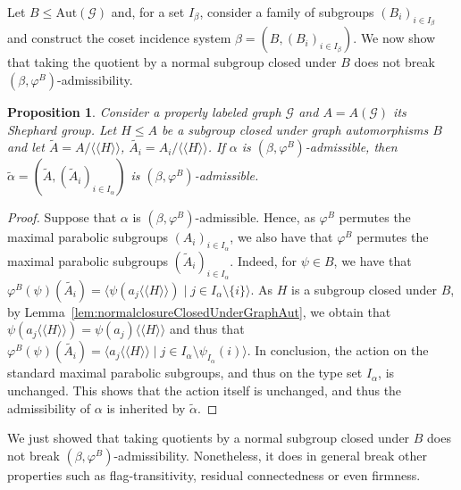 \documentclass[11pt,letterpaper]{amsart}
\newtheorem{prop}{Proposition}[section]
\newcommand{\GG}{\mathcal{G}}
\newcommand{\Aut}{\mathrm{Aut}}
\begin{document}
Let $B\leq \Aut(\GG)$ and, for a set $I_\beta$, consider a family of subgroups $(B_i)_{i\in I_\beta}$ and construct the coset incidence system $\beta=(B,(B_i)_{i\in I_\beta})$. We now show that taking the quotient by a normal subgroup closed under $B$ does not break $(\beta,\varphi^B)$-admissibility.

\begin{prop}\label{prop:QuotientAdmissible}
    Consider a properly labeled graph $\GG$ and $A=A(\GG)$ its Shephard group.
    Let $H\leq A$ be a subgroup closed under graph automorphisms $B$ and let $\tilde{A}=A/\langle\langle H\rangle\rangle$, $\tilde{A_i} = A_i/\langle\langle H\rangle\rangle$.
    If $\alpha$ is $(\beta,\varphi^B)$-admissible, then $\tilde{\alpha}=(\tilde{A},(\tilde{A}_i)_{i\in I_\alpha})$ is $(\beta,\varphi^B)$-admissible.
\end{prop}
\begin{proof}
    Suppose that $\alpha$ is $(\beta,\varphi^B)$-admissible. Hence, 
    as $\varphi^B$ permutes the maximal parabolic subgroups $(A_i)_{i\in I_\alpha}$, we also have that $\varphi^B$ permutes the maximal parabolic subgroups $(\tilde{A}_i)_{i\in I_\alpha}$. Indeed, 
    for $\psi\in B$, we have that $\varphi^B(\psi)(\tilde{A_i})= \langle \psi(a_j \langle\langle H\rangle\rangle) \mid j\in I_\alpha\setminus\{i\}\rangle$. As $H$ is a subgroup closed under $B$, by Lemma~\ref{lem:normalclosureClosedUnderGraphAut}, we obtain that $\psi(a_j \langle\langle H\rangle\rangle) = \psi(a_j)\langle\langle H\rangle\rangle$ and thus that 
    $\varphi^B(\psi)(\tilde{A_i}) = \langle a_j\langle\langle H\rangle\rangle \mid j\in I_\alpha\setminus\psi_{I_\alpha}(i)\rangle$. In conclusion, the action on the standard maximal parabolic subgroups, and thus on the type set $I_\alpha$, is unchanged. This shows that the action itself is unchanged, and thus the admissibility of $\alpha$ is inherited by $\tilde{\alpha}$.

\end{proof}

We just showed that taking quotients by a normal subgroup closed under $B$ does not break $(\beta,\varphi^B)$-admissibility. Nonetheless, it does in general break other properties such as flag-transitivity, residual connectedness or even firmness.
\end{document}
